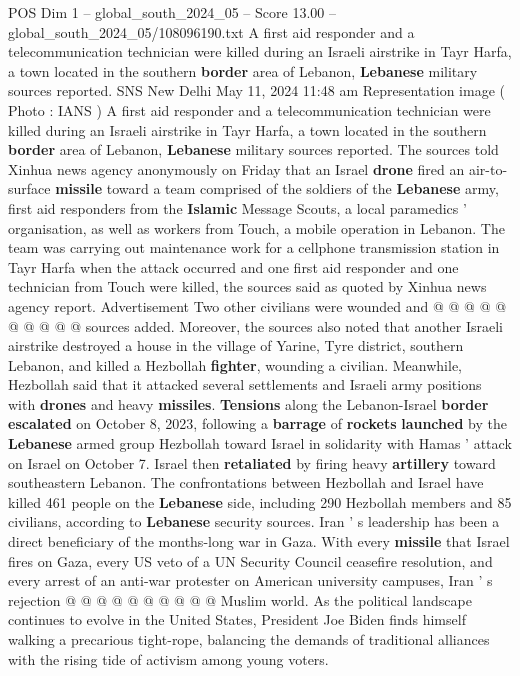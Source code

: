 \begin{textsample}{POS Dim 1 – global\_south\_2024\_05 – Score 13.00 – global\_south\_2024\_05/108096190.txt}  \label{ex:f1_pos_250}
A first aid responder and a telecommunication technician were killed during an Israeli airstrike in Tayr Harfa, a town located in the southern \textbf{border} area of Lebanon, \textbf{Lebanese} military sources reported.
SNS New Delhi May 11, 2024 11:48 am Representation image ( Photo : IANS ) A first aid responder and a telecommunication technician were killed during an Israeli airstrike in Tayr Harfa, a town located in the southern \textbf{border} area of Lebanon, \textbf{Lebanese} military sources reported.
The sources told Xinhua news agency anonymously on Friday that an Israel \textbf{drone} fired an air-to-surface \textbf{missile} toward a team comprised of the soldiers of the \textbf{Lebanese} army, first aid responders from the \textbf{Islamic} Message Scouts, a local paramedics ' organisation, as well as workers from Touch, a mobile operation in Lebanon.
The team was carrying out maintenance work for a cellphone transmission station in Tayr Harfa when the attack occurred and one first aid responder and one technician from Touch were killed, the sources said as quoted by Xinhua news agency report.
Advertisement Two other civilians were wounded and @ @ @ @ @ @ @ @ @ @ sources added.
Moreover, the sources also noted that another Israeli airstrike destroyed a house in the village of Yarine, Tyre district, southern Lebanon, and killed a Hezbollah \textbf{fighter}, wounding a civilian.
Meanwhile, Hezbollah said that it attacked several settlements and Israeli army positions with \textbf{drones} and heavy \textbf{missiles}. \textbf{Tensions} along the Lebanon-Israel \textbf{border} \textbf{escalated} on October 8, 2023, following a \textbf{barrage} of \textbf{rockets} \textbf{launched} by the \textbf{Lebanese} armed group Hezbollah toward Israel in solidarity with Hamas ' attack on Israel on October 7.
Israel then \textbf{retaliated} by firing heavy \textbf{artillery} toward southeastern Lebanon.
The confrontations between Hezbollah and Israel have killed 461 people on the \textbf{Lebanese} side, including 290 Hezbollah members and 85 civilians, according to \textbf{Lebanese} security sources.
Iran ' s leadership has been a direct beneficiary of the months-long war in Gaza.
With every \textbf{missile} that Israel fires on Gaza, every US veto of a UN Security Council ceasefire resolution, and every arrest of an anti-war protester on American university campuses, Iran ' s rejection @ @ @ @ @ @ @ @ @ @ Muslim world.
As the political landscape continues to evolve in the United States, President Joe Biden finds himself walking a precarious tight-rope, balancing the demands of traditional alliances with the rising tide of activism among young voters.

\end{textsample}
